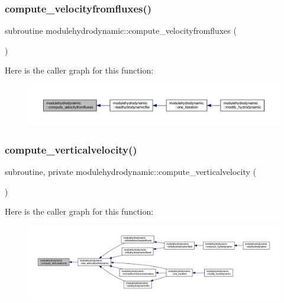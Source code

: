 \subsubsection{\texorpdfstring{compute\+\_\+velocityfromfluxes()}{compute\_velocityfromfluxes()}}
{\footnotesize\ttfamily subroutine modulehydrodynamic\+::compute\+\_\+velocityfromfluxes (\begin{DoxyParamCaption}{ }\end{DoxyParamCaption})\hspace{0.3cm}{\ttfamily [private]}}

Here is the caller graph for this function\+:\nopagebreak
\begin{figure}[H]
\begin{center}
\leavevmode
\includegraphics[width=350pt]{namespacemodulehydrodynamic_a264a587e27769271754a3a3a8979a9b8_icgraph}
\end{center}
\end{figure}
\mbox{\label{namespacemodulehydrodynamic_aced7b976b91c1f042518042a8b14bad5}} 
\subsubsection{\texorpdfstring{compute\+\_\+verticalvelocity()}{compute\_verticalvelocity()}}
{\footnotesize\ttfamily subroutine, private modulehydrodynamic\+::compute\+\_\+verticalvelocity (\begin{DoxyParamCaption}{ }\end{DoxyParamCaption})\hspace{0.3cm}{\ttfamily [private]}}

Here is the caller graph for this function\+:\nopagebreak
\begin{figure}[H]
\begin{center}
\leavevmode
\includegraphics[width=350pt]{namespacemodulehydrodynamic_aced7b976b91c1f042518042a8b14bad5_icgraph}
\end{center}
\end{figure}
\mbox{\label{namespacemodulehydrodynamic_abe745b3932a59db4111fe2798a0c335d}} 
